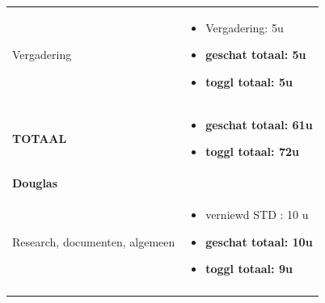 \documentclass{article}
\begin{document}
\begin{center}
\begin{tabularx}{\textwidth}[t]{XX}
\arrayrulecolor{black}\hline

\vspace{2 mm}
Vergadering & 
\begin{minipage}[t]{\linewidth}%
\vspace{2 mm}
\begin{itemize}
\item Vergadering: 5u
\item \textbf{geschat totaal: 5u}
\item \textbf{toggl totaal: 5u}
\vspace{2 mm}
\end{itemize} 
\end{minipage}\\

\arrayrulecolor{black}\hline

\vspace{2 mm}
\textbf{TOTAAL} & 
\begin{minipage}[t]{\linewidth}%
\vspace{2 mm}
\begin{itemize}
\item \textbf{geschat totaal: 61u}
\item \textbf{toggl totaal: 72u}
\vspace{2 mm}
\end{itemize} 
\end{minipage}\\





\arrayrulecolor{green}\hline
\vspace{.1 mm}
\textbf{\textcolor{myGreen}{\large{Douglas}}} \vspace{.1 mm} & \\
\hline
\vspace{1 mm}
Research, documenten, algemeen & 
\begin{minipage}[t]{\linewidth}%
\vspace{1 mm}
\begin{itemize}
\item verniewd STD : 10 u
\item \textbf{geschat totaal: 10u}
\item \textbf{toggl totaal: 9u}
\end{itemize} 
\vspace{1 mm}
\end{minipage}\\

\arrayrulecolor{black}\hline


\end{tabularx}
\end{center}
\end{document}
